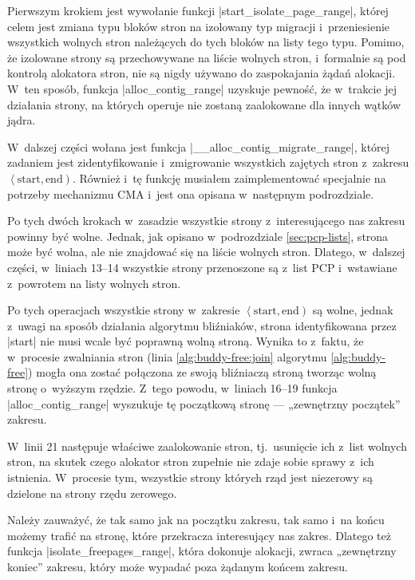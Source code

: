 Pierwszym krokiem jest wywołanie funkcji
\code|start_isolate_page_range|, której celem jest zmiana typu bloków
stron na izolowany typ migracji i~przeniesienie wszystkich wolnych
stron należących do tych bloków na listy tego typu.  Pomimo, że
izolowane strony są przechowywane na liście wolnych stron, i~formalnie
są pod kontrolą alokatora stron, nie są nigdy używano do zaspokajania
żądań alokacji.  W~ten sposób, funkcja \code|alloc_contig_range|
uzyskuje pewność, że w~trakcie jej działania strony, na których
operuje nie zostaną zaalokowane dla innych wątków jądra.

W~dalszej części wołana jest funkcja
\code|__alloc_contig_migrate_range|, której zadaniem jest
zidentyfikowanie i~zmigrowanie wszystkich zajętych stron z~zakresu
$\left<\mathrm{start}, \mathrm{end}\right)$.  Również i~tę funkcję
musiałem zaimplementować specjalnie na potrzeby mechanizmu CMA i~jest
ona opisana w~następnym podrozdziale.

Po tych dwóch krokach w~zasadzie wszystkie strony z~interesującego nas
zakresu powinny być wolne.  Jednak, jak opisano w~podrozdziale
\ref{sec:pcp-lists}, strona może być wolna, ale nie znajdować się na
liście wolnych stron.  Dlatego, w~dalszej części, w~liniach 13--14
wszystkie strony przenoszone są z~list PCP i~wstawiane z~powrotem na
listy wolnych stron.

Po tych operacjach wszystkie strony w~zakresie $\left<\mathrm{start},
\mathrm{end}\right)$ są wolne, jednak z~uwagi na sposób działania
algorytmu bliźniaków, strona identyfikowana przez \code|start| nie
musi wcale być poprawną wolną stroną.  Wynika to z~faktu, że
w~procesie zwalniania stron (linia \ref{alg:buddy-free:join} algorytmu
\ref{alg:buddy-free}) mogła ona zostać połączona ze swoją bliźniaczą
stroną tworząc wolną stronę o~wyższym rzędzie.  Z~tego powodu,
w~liniach 16--19 funkcja \code|alloc_contig_range| wyszukuje tę
początkową stronę --- „zewnętrzny początek” zakresu.

W~linii 21 następuje właściwe zaalokowanie stron, tj.\ usunięcie ich
z~list wolnych stron, na skutek czego alokator stron zupełnie nie
zdaje sobie sprawy z~ich istnienia.  W~procesie tym, wszystkie strony
których rząd jest niezerowy są dzielone na strony rzędu zerowego.

Należy zauważyć, że tak samo jak na początku zakresu, tak samo i~na
końcu możemy trafić na stronę, które przekracza interesujący nas
zakres.  Dlatego też funkcja \code|isolate_freepages_range|,
która dokonuje alokacji, zwraca „zewnętrzny koniec” zakresu, który
może wypadać poza żądanym końcem zakresu.

